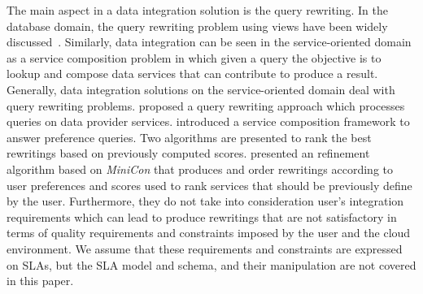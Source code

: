 
The main aspect in a data integration solution is the query rewriting. In the database domain, the query rewriting problem using views have been widely discussed~\cite{Halevy:2001}.
Similarly, data integration can be seen in the service-oriented domain as a service composition problem in which given a query the objective is to lookup and compose data services that can contribute to produce a result.
Generally, data integration solutions on the service-oriented domain deal with
query rewriting problems. 
\cite{Barhamgi2010} proposed a query rewriting approach which processes queries on data provider services.
\cite{Benouaret2011} introduced a service composition framework to answer
preference queries. Two algorithms are presented to rank the best rewritings based on previously computed scores.
\cite{ba2014} presented an refinement algorithm based
on \textit{MiniCon} that produces and order rewritings according to user preferences and scores used to rank services that should be previously define by the user.
Furthermore, they do not take into consideration user's integration requirements which can lead to produce rewritings that are not satisfactory in terms of quality requirements and constraints imposed by the user and the cloud environment. We assume that these requirements and constraints are expressed on SLAs, but the SLA model and schema, and their manipulation are not covered in this paper.